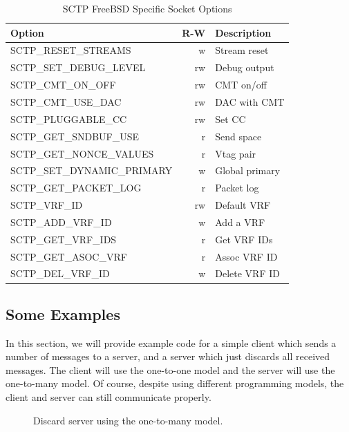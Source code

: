 \documentclass[conference]{IEEEtran}
\begin{document}
\begin{table}[h]
\begin{center}
\begin{tabular}{|l|r|l|}
\hline
Option                      & R-W & Description   \\\hline
\hline
SCTP\_RESET\_STREAMS        & w   & Stream reset  \\\hline
SCTP\_SET\_DEBUG\_LEVEL     & rw  & Debug output  \\\hline
SCTP\_CMT\_ON\_OFF          & rw  & CMT on/off    \\\hline
SCTP\_CMT\_USE\_DAC         & rw  & DAC with CMT  \\\hline
SCTP\_PLUGGABLE\_CC         & rw  & Set CC        \\\hline
SCTP\_GET\_SNDBUF\_USE      & r   & Send space    \\\hline
SCTP\_GET\_NONCE\_VALUES    & r   & Vtag pair     \\\hline
SCTP\_SET\_DYNAMIC\_PRIMARY & w   & Global primary\\\hline
SCTP\_GET\_PACKET\_LOG      & r   & Packet log    \\\hline
SCTP\_VRF\_ID               & rw  & Default VRF   \\\hline
SCTP\_ADD\_VRF\_ID          & w   & Add a VRF     \\\hline
SCTP\_GET\_VRF\_IDS         & r   & Get VRF IDs   \\\hline
SCTP\_GET\_ASOC\_VRF        & r   & Assoc VRF ID  \\\hline
SCTP\_DEL\_VRF\_ID          & w   & Delete VRF ID \\\hline
\end{tabular}
\end{center}
\caption{SCTP FreeBSD Specific Socket Options\label{bsdsockopt}}
\end{table}


\subsection{Some Examples}

In this section, we will provide example code for a simple client
which sends a number of messages to a server, and a server which
just discards all received messages. The client will use the one-to-one
model and the server will use the one-to-many model. Of course,
despite using different programming models, the client and server can
still communicate properly.

\begin{figure}[h]
\lstset{numbers=left, frame=single, basicstyle=\small\ttfamily}

\caption{Discard server using the one-to-many model.}
\label{fig:discard-server}
\end{figure}
\end{document}
